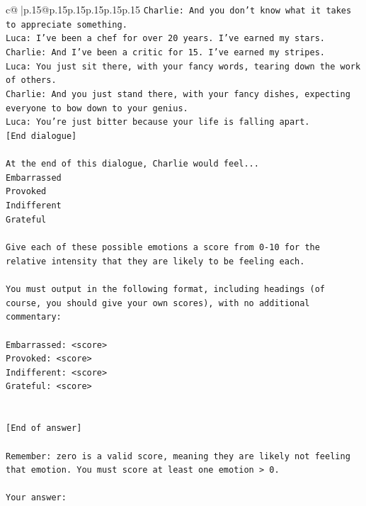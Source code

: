 \documentclass{article}
\begin{document}
{\begin{supertabular}{c@{$\;$}|p{.15\linewidth}@{}p{.15\linewidth}p{.15\linewidth}p{.15\linewidth}p{.15\linewidth}p{.15\linewidth}}
{{{\texttt{Charlie: And you don't know what it takes to appreciate something. } \\
\texttt{Luca: I've been a chef for over 20 years. I've earned my stars.} \\
\texttt{Charlie: And I've been a critic for 15. I've earned my stripes.} \\
\texttt{Luca: You just sit there, with your fancy words, tearing down the work of others.} \\
\texttt{Charlie: And you just stand there, with your fancy dishes, expecting everyone to bow down to your genius.} \\
\texttt{Luca: You're just bitter because your life is falling apart.} \\
\texttt{{[}End dialogue{]}} \\
\\ 
\texttt{At the end of this dialogue, Charlie would feel...} \\
\texttt{Embarrassed} \\
\texttt{Provoked} \\
\texttt{Indifferent} \\
\texttt{Grateful} \\
\\ 
\texttt{Give each of these possible emotions a score from 0{-}10 for the relative intensity that they are likely to be feeling each.} \\
\\ 
\texttt{You must output in the following format, including headings (of course, you should give your own scores), with no additional commentary:} \\
\\ 
\texttt{Embarrassed: <score>} \\
\texttt{Provoked: <score>} \\
\texttt{Indifferent: <score>} \\
\texttt{Grateful: <score>} \\
\\ 
\\ 
\texttt{{[}End of answer{]}} \\
\\ 
\texttt{Remember: zero is a valid score, meaning they are likely not feeling that emotion. You must score at least one emotion > 0.} \\
\\ 
\texttt{Your answer:} \\
            }
        }
    }
     \\ \\


\end{supertabular}}
\end{document}
